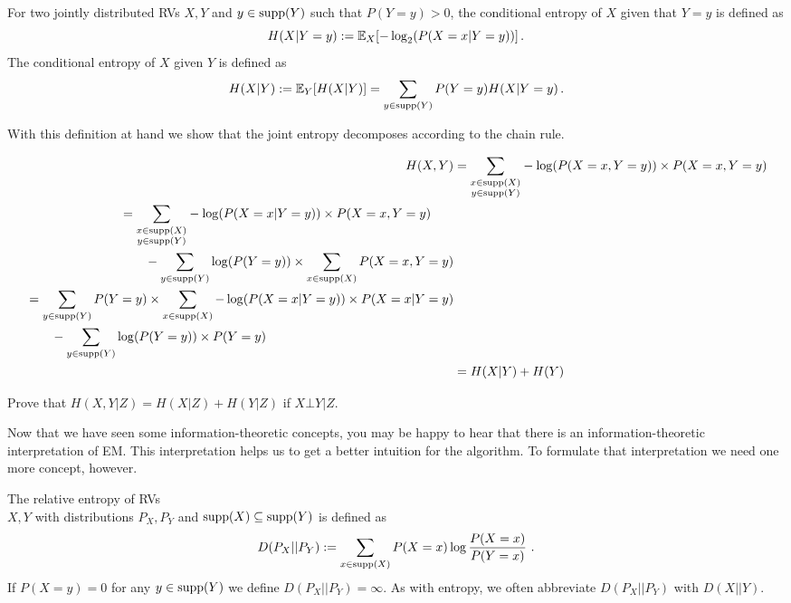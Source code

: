 \begin{Definition}
For two jointly distributed RVs $ X,Y $ and $y \in \operatorname{supp}(Y)$ such that $P(Y=y)>0$, the conditional entropy of $ X $ given that $ Y=y $ is defined as
$$ H(X|Y=y) := \mathbb{E}_X[-\log_{2}(P(X=x|Y=y))] \, . $$
The conditional entropy of $X$ given $Y$ is defined as
$$ H(X|Y) := \mathbb{E}_Y[ H(X|Y) ] = \sum_{y \in \operatorname{supp}(Y)} P(Y=y) H(X|Y=y) \, .$$
\end{Definition}

With this definition at hand we show that the joint entropy decomposes according to the
chain rule.

\begin{align*}
H(X,Y) &= \underset{\substack{x \in \operatorname{supp}(X)\\y \in \operatorname{supp}(Y)}}{\sum} -\log(P(X=x,Y=y)) \times P(X=x, Y=y) \\
\begin{split}
&= \underset{\substack{x \in \operatorname{supp}(X)\\ y \in \operatorname{supp}(Y)}}{\sum} -\log(P(X=x| Y=y)) \times P(X=x,Y=y) \\ 
&\qquad - \underset{y \in \operatorname{supp}(Y)}{\sum}\log(P(Y=y)) \times \sum_{x \in \operatorname{supp}(X)} P(X=x,Y=y) 
\end{split} \\
\begin{split}
&=\sum_{y \in \operatorname{supp}(Y)} P(Y=y) \times \sum_{x \in \operatorname{supp}(X)} -\log(P(X=x| Y=y)) \times P(X=x|Y=y) \\ &\qquad - \underset{y \in \operatorname{supp}(Y)}{\sum}\log(P(Y=y)) \times P(Y=y)
\end{split} \\
&= H(X|Y) + H(Y)
\end{align*}

\begin{Exercise}
Prove that $ H(X,Y|Z) = H(X|Z) + H(Y|Z) $ if $ X \bot Y|Z $.
\end{Exercise}

Now that we have seen some information-theoretic concepts, you may be happy to hear that there is an information-theoretic interpretation
of EM. This interpretation helps us to get a better intuition for the algorithm. To formulate that interpretation we need
one more concept, however.

\begin{Definition}
The relative entropy of RVs \\ $ X,Y $ with distributions $P_X, P_Y$ and $\operatorname{supp}(X) \subseteq \operatorname{supp}(Y) $ is defined as
$$ D(P_X||P_Y) := \sum_{x \in \operatorname{supp}(X)} P(X=x) \log \frac{P(X=x)}{P(Y=x)} \ . $$
If $ P(X=y) = 0 $ for any $ y \in \operatorname{supp}(Y) $ we define $ D(P_X||P_Y) = \infty $. As with entropy, we often abbreviate $D(P_X||P_Y)$ with  $D(X||Y)$.
\end{Definition}

